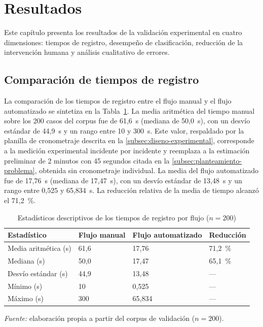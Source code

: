 \section{Resultados}\label{sec:resultados}

Este capítulo presenta los resultados de la validación experimental en cuatro dimensiones: tiempos de registro, desempeño de clasificación, reducción de la intervención humana y análisis cualitativo de errores.

\subsection{Comparación de tiempos de registro}\label{subsec:comparacion-tiempos}

La comparación de los tiempos de registro entre el flujo manual y el flujo automatizado se sintetiza en la Tabla~\ref{tab:tiempos}. La media aritmética del tiempo manual sobre los 200 casos del corpus fue de 61,6~s (mediana de 50,0~s), con un desvío estándar de 44,9~s y un rango entre 10 y 300~s. Este valor, respaldado por la planilla de cronometraje descrita en la \autoref{subsec:diseno-experimental}, corresponde a la medición experimental incidente por incidente y reemplaza a la estimación preliminar de 2 minutos con 45 segundos citada en la \autoref{subsec:planteamiento-problema}, obtenida sin cronometraje individual. La media del flujo automatizado fue de 17,76~s (mediana de 17,47~s), con un desvío estándar de 13,48~s y un rango entre 0,525 y 65,834~s. La reducción relativa de la media de tiempo alcanzó el 71,2~\%.

\begin{table}[htbp]
\centering
\caption{Estadísticos descriptivos de los tiempos de registro por flujo (\(n = 200\))}
\label{tab:tiempos}
\small
\begin{tabular}{@{}>{\raggedright\arraybackslash}p{4.0cm} p{3.5cm} p{3.5cm} p{2.5cm}@{}}
\toprule
\textbf{Estadístico} & \textbf{Flujo manual} & \textbf{Flujo automatizado} & \textbf{Reducción} \\
\midrule
Media aritmética (s)      & 61,6   & 17,76   & 71,2~\% \\
Mediana (s)               & 50,0   & 17,47   & 65,1~\% \\
Desvío estándar (s)       & 44,9   & 13,48   & --- \\
Mínimo (s)                & 10     & 0,525   & --- \\
Máximo (s)                & 300    & 65,834  & --- \\
\bottomrule
\end{tabular}
\par\smallskip
{\footnotesize\textit{Fuente:} elaboración propia a partir del corpus de validación (\(n = 200\)).\par}
\end{table}


